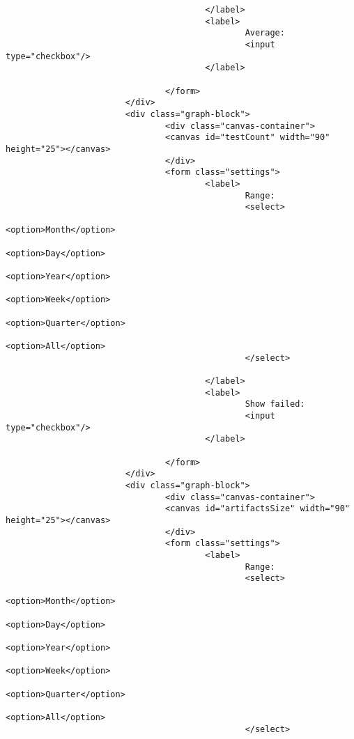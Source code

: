 \begin{lstlisting}
                                        </label>
                                        <label>
                                                Average:
                                                <input type="checkbox"/>
                                        </label>

                                </form>
                        </div>
                        <div class="graph-block">
                                <div class="canvas-container">
                                <canvas id="testCount" width="90" height="25"></canvas>
                                </div>
                                <form class="settings">
                                        <label>
                                                Range:
                                                <select>
                                                        <option>Month</option>
                                                        <option>Day</option>
                                                        <option>Year</option>
                                                        <option>Week</option>
                                                        <option>Quarter</option>
                                                        <option>All</option>
                                                </select>

                                        </label>
                                        <label>
                                                Show failed:
                                                <input type="checkbox"/>
                                        </label>

                                </form>
                        </div>
                        <div class="graph-block">
                                <div class="canvas-container">
                                <canvas id="artifactsSize" width="90" height="25"></canvas>
                                </div>
                                <form class="settings">
                                        <label>
                                                Range:
                                                <select>
                                                        <option>Month</option>
                                                        <option>Day</option>
                                                        <option>Year</option>
                                                        <option>Week</option>
                                                        <option>Quarter</option>
                                                        <option>All</option>
                                                </select>


\end{lstlisting}
